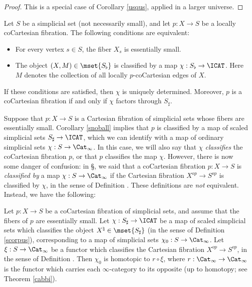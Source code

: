 \begin{proof}
This is a special case of Corollary \ref{usqus}, applied in a larger universe.
\end{proof}

\begin{corollary}\label{snoball}
Let $S$ be a simplicial set (not necessarily small), and let $p: X \rightarrow S$ be a locally coCartesian fibration. The following conditions are equivalent:
\begin{itemize}
\item For every vertex $s \in S$, the fiber $X_{s}$ is essentially small.
\item The object $(X,M) \in \mset{ S_{\flat}}$ is classified by a map $\chi: S_{\flat} \rightarrow \ICAT$. Here $M$ denotes the collection of all locally $p$-coCartesian edges of $X$.
\end{itemize}
If these conditions are satisfied, then $\chi$ is uniquely determined. Moreover, 
$p$ is a coCartesian fibration if and only if $\chi$ factors through $S_{\sharp}$.
\end{corollary}

Suppose that $p: X \rightarrow S$ is a Cartesian fibration of simplicial sets
whose fibers are essentially small. Corollary \ref{snoball} implies that
$p$ is classified by a map of scaled simplicial sets $S_{\sharp} \rightarrow \ICAT$, which we can identify with a map of ordinary simplicial sets $\chi: S \rightarrow \Cat_{\infty}$. In this case, we will also say that $\chi$ {\it classifies} the coCartesian fibration $p$, or that $p$ classifies the map $\chi$.
However, there is now some danger of confusion: in \S {}, we said that a 
coCartesian fibration $p: X \rightarrow S$ is {\em classified by} a map $\chi: S \rightarrow \Cat_{\infty}$ if the Cartesian fibration $X^{op} \rightarrow S^{op}$ is classified by $\chi$, in the sense of 
Definition . These definitions are {\em not} equivalent. Instead, we have the following:

\begin{proposition}\label{juspus}
Let $p: X \rightarrow S$ be a coCartesian fibration of simplicial sets, and assume that the fibers of $p$ are essentially small. Let $\chi: S_{\sharp} \rightarrow \ICAT$ be a map of scaled simplicial sets
which classifies the object $X^{\natural} \in \mset{ S_{\sharp}}$ (in the sense of Definition \ref{scorpus}), corresponding to a map of simplicial sets $\chi_0: S \rightarrow \Cat_{\infty}$. Let
$\xi: S \rightarrow \Cat_{\infty}$ be a functor which classifies the Cartesian fibration
$X^{op} \rightarrow S^{op}$, in the sense of Definition . Then
$\chi_0$ is homotopic to $r \circ \xi$, where $r: \Cat_{\infty} \rightarrow \Cat_{\infty}$
is the functor which carries each $\infty$-category to its opposite (up to homotopy;
see Theorem \ref{cabbi}).
\end{proposition}

